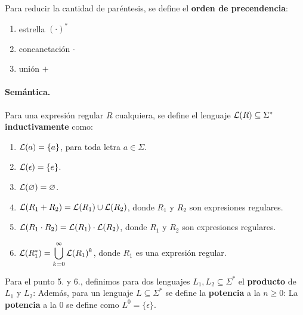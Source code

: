 Para reducir la cantidad de paréntesis, se define el \textbf{orden de precendencia}:
\begin{enumerate}
    \item estrella $(\cdot)^*$
    \item concanetación $\cdot$
    \item unión $+$
\end{enumerate}

\paragraph{Semántica.} Para una expresión regular $R$ cualquiera, se define el lenguaje $\mathcal{L}(R) \subseteq \Sigma^*$ \textbf{inductivamente} como:
\begin{enumerate}
    \item $\mathcal{L}(a) = \{a\}$, para toda letra $a \in \Sigma$.
    \item $\mathcal{L}(\epsilon) = \{e\}$.
    \item $\mathcal{L}(\varnothing) = \varnothing$.
    \item $\mathcal{L}(R_1 + R_2) = \mathcal{L}(R_1) \cup \mathcal{L}(R_2)$, donde $R_1$ y $R_2$ son expresiones regulares.
    \item $\mathcal{L}(R_1 \cdot R_2) = \mathcal{L}(R_1)\cdot \mathcal{L}(R_2)$, donde $R_1$ y $R_2$ son expresiones regulares.
    \item $\mathcal{L}(R_1^*)=\displaystyle\bigcup_{k=0}^\infty \mathcal{L}(R_1)^k$, donde $R_1$ es una expresión regular.
\end{enumerate}

Para el punto 5. y 6., definimos para dos lenguajes $L_1,L_2 \subseteq \Sigma^*$ el \textbf{producto} de $L_1$ y $L_2$:
Además, para un lenguaje $L\subseteq \Sigma^*$ se define la \textbf{potencia} a la $n \ge 0$:
La \textbf{potencia} a la $0$ se define como $L^0 = \{\epsilon\}$.


